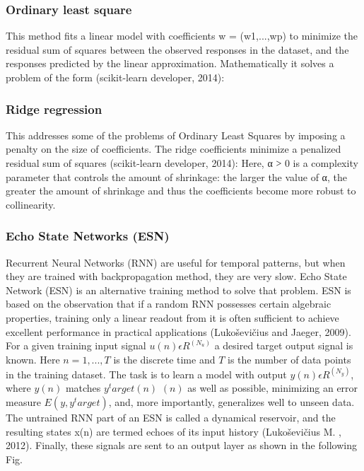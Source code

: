 \documentclass[review]{elsarticle}
\begin{document}
\subsubsection{Ordinary least square}
This method fits a linear model with coefficients w = (w1,...,wp) to minimize the residual sum of squares between the observed responses in the dataset, and the responses predicted by the linear approximation. Mathematically it solves a problem of the form (scikit-learn developer, 2014):

\subsubsection{Ridge regression}

This addresses some of the problems of Ordinary Least Squares by imposing a penalty on the size of coefficients. The ridge coefficients minimize a penalized residual sum of squares (scikit-learn developer, 2014):
Here, α ˃ 0 is a complexity parameter that controls the amount of shrinkage: the larger the value of α, the greater the amount of shrinkage and thus the coefficients become more robust to collinearity.
\subsubsection{Echo State Networks (ESN)}
Recurrent Neural Networks (RNN) are useful for temporal patterns, but when they are trained with backpropagation method, they are very slow.  Echo State Network (ESN) is an alternative training method to solve that problem.  ESN is based on the observation that if a random RNN possesses certain algebraic properties, training only a linear readout from it is often sufficient to achieve excellent performance in practical applications (Lukoševičius and Jaeger, 2009). 
For a given training input signal $u(n)  ϵ R^(N_u )$ a desired target output signal 
is known. Here $n = 1, . . . ,T$ is the discrete time and $T$ is the number of data points in the training dataset. The task is to learn a model with output $y(n)  ϵ R^(N_y )$, where $y(n)$ matches $y^target(n)$ $(n)$ as well as possible, minimizing an error measure $E(y,y^target)$, and, more importantly, generalizes well to unseen data. The untrained RNN part of an ESN is called a dynamical reservoir, and the resulting states x(n) are termed echoes of its input history
 (Lukoševičius M. , 2012). Finally, these signals are sent to an output layer as shown in the following Fig.
 
\end{document}
